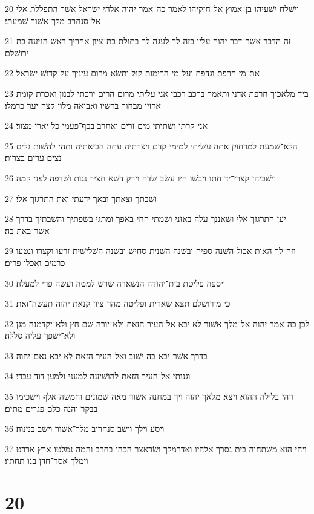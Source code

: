 \par 20 וישׁלח ישׁעיהו בן־אמוץ אל־חזקיהו לאמר כה־אמר יהוה אלהי ישׂראל אשׁר התפללת אלי אל־סנחרב מלך־אשׁור שׁמעתי׃
\par 21 זה הדבר אשׁר־דבר יהוה עליו בזה לך לעגה לך בתולת בת־ציון אחריך ראשׁ הניעה בת ירושׁלם׃
\par 22 את־מי חרפת וגדפת ועל־מי הרימות קול ותשׂא מרום עיניך על־קדושׁ ישׂראל׃
\par 23 ביד מלאכיך חרפת אדני ותאמר ברכב רכבי אני עליתי מרום הרים ירכתי לבנון ואכרת קומת ארזיו מבחור ברשׁיו ואבואה מלון קצה יער כרמלו׃
\par 24 אני קרתי ושׁתיתי מים זרים ואחרב בכף־פעמי כל יארי מצור׃
\par 25 הלא־שׁמעת למרחוק אתה עשׂיתי למימי קדם ויצרתיה עתה הביאתיה ותהי להשׁות גלים נצים ערים בצרות׃
\par 26 וישׁביהן קצרי־יד חתו ויבשׁו היו עשׂב שׂדה וירק דשׁא חציר גגות ושׁדפה לפני קמה׃
\par 27 ושׁבתך וצאתך ובאך ידעתי ואת התרגזך אלי׃
\par 28 יען התרגזך אלי ושׁאננך עלה באזני ושׂמתי חחי באפך ומתגי בשׂפתיך והשׁבתיך בדרך אשׁר־באת בה׃
\par 29 וזה־לך האות אכול השׁנה ספיח ובשׁנה השׁנית סחישׁ ובשׁנה השׁלישׁית זרעו וקצרו ונטעו כרמים ואכלו פרים׃
\par 30 ויספה פליטת בית־יהודה הנשׁארה שׁרשׁ למטה ועשׂה פרי למעלה׃
\par 31 כי מירושׁלם תצא שׁארית ופליטה מהר ציון קנאת יהוה תעשׂה־זאת׃
\par 32 לכן כה־אמר יהוה אל־מלך אשׁור לא יבא אל־העיר הזאת ולא־יורה שׁם חץ ולא־יקדמנה מגן ולא־ישׁפך עליה סללה׃
\par 33 בדרך אשׁר־יבא בה ישׁוב ואל־העיר הזאת לא יבא נאם־יהוה׃
\par 34 וגנותי אל־העיר הזאת להושׁיעה למעני ולמען דוד עבדי׃
\par 35 ויהי בלילה ההוא ויצא מלאך יהוה ויך במחנה אשׁור מאה שׁמונים וחמשׁה אלף וישׁכימו בבקר והנה כלם פגרים מתים׃
\par 36 ויסע וילך וישׁב סנחריב מלך־אשׁור וישׁב בנינוה׃
\par 37 ויהי הוא משׁתחוה בית נסרך אלהיו ואדרמלך ושׂראצר הכהו בחרב והמה נמלטו ארץ אררט וימלך אסר־חדן בנו תחתיו׃

\chapter{20}

